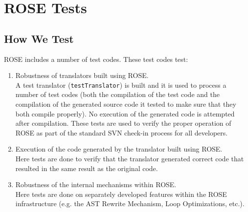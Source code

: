 \chapter{ROSE Tests}

\label{tests:introduction}

\section{How We Test}

ROSE includes a number of test codes. These test codes test:
\begin{enumerate}
   \item Robustness of translators built using ROSE. \\
         A test translator ({\tt testTranslator}) is built and it is used to process a number of
         test codes (both the compilation of the test code and the compilation of
         the generated source code it tested to make sure that they both compile
         properly). No execution of the generated code is attempted after compilation.
         These tests are used to verify the proper operation of ROSE as part of
         the standard SVN check-in process for all developers.

   \item Execution of the code generated by the translator built using ROSE. \\
         Here tests are done to verify that the translator generated correct code
         that resulted in the same result as the original code.

   \item Robustness of the internal mechanisms within ROSE. \\
         Here tests are done on separately developed features within the ROSE
         infrastructure (e.g. the AST Rewrite Mechanism, Loop Optimizations, etc.).
\end{enumerate}

